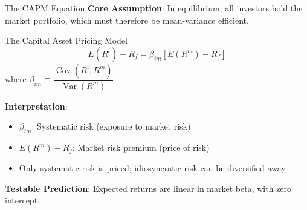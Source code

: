 \documentclass{beamer}
\begin{document}
\begin{frame}{The CAPM Equation}
	\textbf{Core Assumption}: In equilibrium, all investors hold the market portfolio, which must therefore be mean-variance efficient.
	
	\vspace{10pt}
	\begin{block}{The Capital Asset Pricing Model}
		\begin{equation*}
			E(R^i) - R_f = \beta_{im}[E(R^m) - R_f]
		\end{equation*}
		where $\beta_{im} \equiv \dfrac{\operatorname{Cov}(R^i, R^m)}{\operatorname{Var}(R^m)}$
	\end{block}
	
	\vspace{10pt}
	\textbf{Interpretation}:
	\begin{itemize}
		\item $\beta_{im}$: Systematic risk (exposure to market risk)
		\item $E(R^m) - R_f$: Market risk premium (price of risk)
		\item Only systematic risk is priced; idiosyncratic risk can be diversified away
	\end{itemize}
	
	\vspace{8pt}
	\textbf{Testable Prediction}: Expected returns are \alert{linear in market beta}, with zero intercept.
\end{frame}
\end{document}
